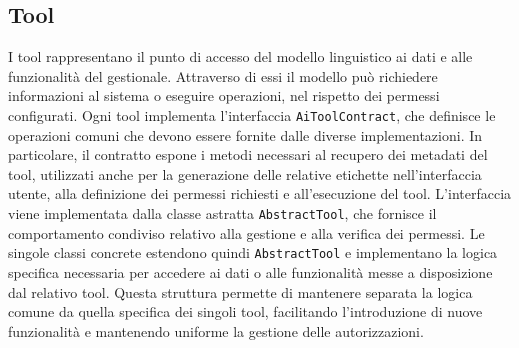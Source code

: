 \subsection{Tool}
I tool rappresentano il punto di accesso del modello linguistico ai dati e alle funzionalità del gestionale. Attraverso di essi il modello può richiedere informazioni 
al sistema o eseguire operazioni, nel rispetto dei permessi configurati.
\newline
Ogni tool implementa l'interfaccia \texttt{AiToolContract}, che definisce le operazioni comuni che devono essere fornite dalle diverse implementazioni. In particolare, 
il contratto espone i metodi necessari al recupero dei metadati del tool, utilizzati anche per la generazione delle relative etichette nell'interfaccia utente, alla definizione 
dei permessi richiesti e all'esecuzione del tool.
\newline
L'interfaccia viene implementata dalla classe astratta \texttt{AbstractTool}, che fornisce il comportamento condiviso relativo alla gestione e alla verifica dei permessi. Le 
singole classi concrete estendono quindi \texttt{AbstractTool} e implementano la logica specifica necessaria per accedere ai dati o alle funzionalità messe a disposizione dal 
relativo tool.
\newline
Questa struttura permette di mantenere separata la logica comune da quella specifica dei singoli tool, facilitando l'introduzione di nuove funzionalità e mantenendo uniforme 
la gestione delle autorizzazioni.

